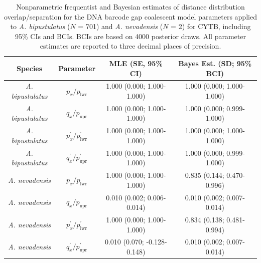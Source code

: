 \documentclass[12pt]{article}
\begin{document}
\begin{table}[H]

\small

\centering

\caption{Nonparametric frequentist and Bayesian estimates of distance distribution overlap/separation for the DNA barcode gap coalescent model parameters applied to \textit{A. bipustulatus} ($N$ = 701) and \textit{A. nevadensis} ($N$ = 2) for CYTB, including 95\%  CIs and BCIs. BCIs are based on 4000 posterior draws. All parameter estimates are reported to three decimal places of precision.}

\begin{tabular}{cccc} \hline

\textbf{Species} & \textbf{Parameter} & \textbf{MLE (SE, 95\% CI)} & \textbf{Bayes Est. (SD; 95\% BCI)} \\  \hline
\textit{A. bipustulatus} & $p_x/p_\mathrm{lwr}$ & 1.000 (0.000; 1.000-1.000) & 1.000 (0.000; 1.000-1.000) \\
\textit{A. bipustulatus} & $q_x/p_\mathrm{upr}$ & 1.000 (0.000; 1.000-1.000) & 1.000 (0.000; 0.999-1.000) \\
\textit{A. bipustulatus} & $p^{'}_x/p^{'}_\mathrm{lwr}$ & 1.000 (0.000; 1.000-1.000) & 1.000 (0.000; 1.000-1.000)  \\
\textit{A. bipustulatus} & $q^{'}_x/p^{'}_\mathrm{upr}$ & 1.000 (0.000; 1.000-1.000) & 1.000 (0.000; 0.999-1.000) \\


\textit{A. nevadensis} & $p_x/p_\mathrm{lwr}$ & 1.000 (0.000; 1.000-1.000) & 0.835 (0.144; 0.470-0.996) \\
\textit{A. nevadensis} & $q_x/p_\mathrm{upr}$ & 0.010 (0.002; 0.006-0.014) & 0.010 (0.002; 0.007-0.014) \\
\textit{A. nevadensis} &  $p^{'}_x/p^{'}_\mathrm{lwr}$ & 1.000 (0.000; 1.000-1.000) & 0.834 (0.138; 0.481-0.994) \\
\textit{A. nevadensis} &  $q^{'}_x/p^{'}_\mathrm{upr}$ & 0.010 (0.070; -0.128-0.148) & 0.010 (0.002; 0.007-0.014) \\


\hline


\end{tabular}

\end{table}
\end{document}

